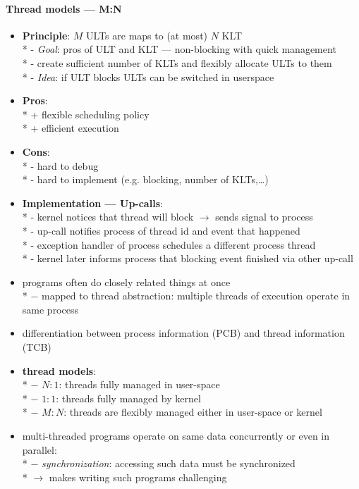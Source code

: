 \paragraph{Thread models --- M:N}
\begin{itemize}
  \item \textbf{Principle}: \( M \) ULTs are maps to (at most) \( N \) KLT \\*
    - \emph{Goal}: pros of ULT and KLT --- non-blocking with quick management \\*
    - create sufficient number of KLTs and flexibly allocate ULTs to them \\*
    - \emph{Idea}: if ULT blocks ULTs can be switched in userspace
  \item \textbf{Pros}: \\*
    + flexible scheduling policy \\*
    + efficient execution
  \item \textbf{Cons}: \\*
    - hard to debug \\*
    - hard to implement (e.g. blocking, number of KLTs,\dots)
  \item \textbf{Implementation --- Up-calls}: \\*
    - kernel notices that thread will block \( \to \) sends signal to process \\*
    - up-call notifies process of thread id and event that happened \\*
    - exception handler of process schedules a different process thread \\*
    - kernel later informs process that blocking event finished via other up-call
\end{itemize}

\begin{summary}
  \begin{itemize}
    \item programs often do closely related things at once \\*
      $ - $  mapped to thread abstraction: multiple threads of execution operate in same process
    \item differentiation between process information (PCB) and thread information (TCB)
    \item \textbf{thread models}: \\*
      $ - $ $ N:1 $: threads fully managed in user-space \\*
      $ - $ $ 1:1 $: threads fully managed by kernel \\*
      $ - $ $ M:N $: threads are flexibly managed either in user-space or kernel
    \item multi-threaded programs operate on same data concurrently or even in parallel: \\*
      $ - $ \emph{synchronization}: accessing such data must be synchronized \\*
      $ \to $ makes writing such programs challenging
  \end{itemize}
\end{summary}